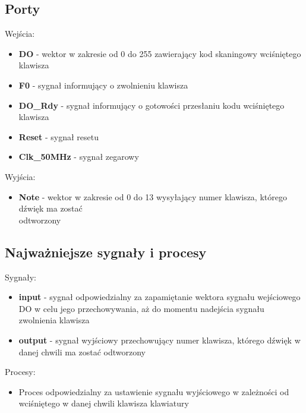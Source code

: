 \documentclass[a4paper]{report}
\begin{document}
		\subsection{Porty}
			{\Large Wejścia:}
			\begin{itemize}	 
				\item \textbf{DO} - wektor w zakresie od 0 do 255 zawierający kod skaningowy wciśniętego klawisza
				\item \textbf{F0} - sygnał informujący o zwolnieniu klawisza
				\item \textbf{DO\_Rdy} - sygnał informujący o gotowości przesłaniu kodu wciśniętego klawisza
				\item \textbf{Reset} - sygnał resetu
				\item \textbf{Clk\_50MHz} - sygnał zegarowy
			\end{itemize}
			{\Large Wyjścia:}
			\begin{itemize} 
				\item \textbf{Note} - wektor w zakresie od 0 do 13 wysyłający numer klawisza, którego dźwięk ma zostać \\odtworzony
			\end{itemize}
		\subsection{Najważniejsze sygnały i procesy}
			{\Large Sygnały:}
			\begin{itemize}
				\item \textbf{input} - sygnał odpowiedzialny za zapamiętanie wektora sygnału wejściowego DO 
				w celu jego przechowywania, aż do momentu nadejścia sygnału zwolnienia klawisza
				\item \textbf{output} - sygnał wyjściowy przechowujący numer klawisza, którego dźwięk w danej chwili ma zostać odtworzony
			\end{itemize}
			\newpage
			{\Large Procesy:}
			\begin{itemize}
			\item Proces odpowiedzialny za ustawienie sygnału wyjściowego w zależności od wciśniętego w danej chwili klawisza klawiatury\\
				
			\end{itemize}
			
\end{document}
